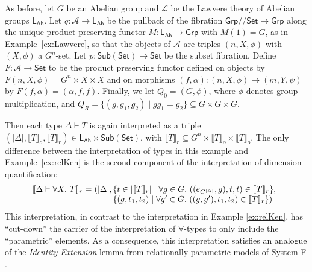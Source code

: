 \documentclass[a4paper,UKenglish]{lipics}
\theoremstyle{plain}
\newcommand{\msf}[1]{\mathsf{#1}} %
\newcommand{\Grp}{\msf{Grp}}
\newcommand{\Set}{\msf{Set}}
\newcommand{\Sub}[1]{\msf{Sub}(#1)}
\newcommand{\LAb}{\msf{L}_{\msf{Ab}}}
\newcommand{\A}{\mathcal{A}}
\newcommand{\Lslice}[1]{#1/\!/\Set}
\newcommand{\GrpSet}{\Lslice{\Grp}}
\newcommand{\semo}[1]{\ensuremath{\llbracket #1 \rrbracket _o}}
\newcommand{\semr}[1]{\ensuremath{\llbracket #1 \rrbracket _r}}
\begin{document}
\begin{example}\label{ex:relMon}
As before, let $G$ be an Abelian group and $\mathcal{L}$ be the Lawvere theory of Abelian groups $\LAb$. Let $q:\A\to\LAb$ be the pullback of the fibration $\GrpSet\to\Grp$ along the unique product-preserving functor $M:\LAb\to\Grp$ with $M(1)=G$, as in Example~\ref{ex:Lawvere}, so that the objects of $\A$ are triples $(n,X,\phi)$ with $(X,\phi)$ a $G^n$-set. Let $p:\Sub{\Set} \rightarrow \Set$ be the subset fibration. Define $F:\A\rightarrow \Set$ to be the product preserving functor defined on objects by $F(n,X, \phi) = G^{n} \times X \times X$ and on morphisms $(f, \alpha) : (n,X,\phi) \rightarrow (m, Y,\psi)$
by $F(f,\alpha) = (\alpha, f, f)$. Finally, we let $Q_0 = (G,\phi)$, where $\phi$ denotes group multiplication, and $Q_R = \{(g,g_1,g_2) \mathrel| gg_1 = g_2 \} \subseteq G \times G \times G$.

  Then each type $\Delta \vdash T$ is again interpreted as a triple
  $(|\Delta|, \semo{T}, \semr{T}) \in \LAb \times \Sub{\Set}$, with
  $\semr{T} \subseteq G^n \times \semo{T} \times \semo{T}$. The only
  difference between the interpretation of types in this example and
  Example~\ref{ex:relKen} is the second component of the
  interpretation of dimension quantification:
  \begin{displaymath}
    \begin{array}{l@{\hspace{0.3em}}c@{\hspace{0.3em}}l}
      \semr{\Delta \vdash \forall X.~T} & = & (|\Delta|,
      \begin{array}[t]{@{}l}
        \{ t \in |\semr{T}| \mathrel| \forall g \in G.~((e_{G^{|\Delta|}},g), t, t) \in \semr{T} \},\\
        \{ (g, t_1, t_2) \mathrel| \forall g' \in G.~((g,g'), t_1, t_2) \in \semr{T} \} )
      \end{array}
    \end{array}
  \end{displaymath}
  This interpretation, in contrast to the interpretation in Example
  \ref{ex:relKen}, has ``cut-down'' the carrier of the interpretation
  of $\forall$-types to only include the ``parametric'' elements. As a
  consequence, this interpretation satisfies an analogue of the
  \emph{Identity Extension} lemma from relationally parametric models
  of System F \cite{reynolds1983types}.


\end{example}
\end{document}
